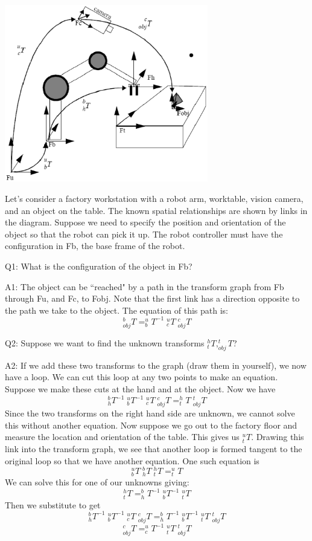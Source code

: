 %
%
\begin{Example}

\includegraphics[width=3.5in]{figs02/camtablearmexample.eps}

Let’s consider a factory workstation with a robot arm, worktable, vision
camera, and an object on the table. The known spatial relationships are shown by links in the diagram. Suppose we need to specify the position and orientation of the object so that the robot can pick it up. The robot controller must have the configuration in Fb, the base frame of the robot.

Q1:
What is the configuration of the object in Fb?

A1:
The object can be ``reached" by a path in the transform graph from
Fb through Fu, and Fc, to Fobj. Note that the first link has a direction
opposite to the path we take to the object. The equation of this path
is:
\[
^b_{obj}T = ^u_bT^{-1} \;^u_cT \;^c_{obj}T
\]

Q2:
Suppose we want to find the unknown transforms $^h_tT, ^t_{obj}T$?

A2:
If we add these two transforms to the graph (draw them in yourself),
we now have a loop. We can cut this loop at any two points to make
an equation. Suppose we make these cuts at the hand and at the object.
Now we have
\[
^b_hT^{-1} \;^u_bT^{-1} \;^u_cT \;^c_{obj}T = ^h_tT \;^t_{obj}T
\]
Since the two transforms on the right hand side are unknown, we
cannot solve this without another equation. Now suppose we go out
to the factory floor and measure the location and orientation of the
table. This gives us $^u_tT$. Drawing this link into the transform graph, we see that another loop is formed tangent to the original loop so that we have another equation. One such equation is
\[
^u_bT \;^b_hT \;^h_tT = ^u_tT
\]
We can solve this for one of our unknowns giving:
\[
^h_tT = ^b_hT^{-1} \;^u_bT^{-1} \;^u_tT
\]
Then we substitute to get
\[
 ^b_hT^{-1} \;^u_bT^{-1} \;^u_cT \; ^c_{obj}T = ^b_hT^{-1} \;^u_bT^{-1} \;^u_tT \;^t_{obj}T
\]
\[
^c_{obj}T = ^u_cT^{-1} \;^u_tT \;^t_{obj}T
\]
\end{Example}

